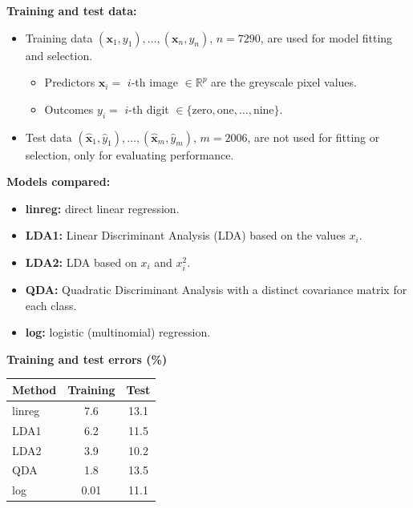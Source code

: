 \documentclass[
  letterpaper,
  DIV=11,
  numbers=noendperiod]{scrartcl}
\providecommand{\tightlist}{%
  \setlength{\itemsep}{0pt}\setlength{\parskip}{0pt}}\usepackage{longtable,booktabs,array}
\begin{document}
\begin{minipage}{0.55\textwidth}
\textbf{Training and test data:}  
\begin{itemize}
\tightlist
\item Training data $(\mathbf{x}_1, y_1), \ldots, (\mathbf{x}_n, y_n)$, $n = 7290$, are used for model fitting and selection.  
  \begin{itemize}
  \tightlist
  \item Predictors $\mathbf{x}_i =$ $i$-th image $\in \mathbb{R}^p$ are the greyscale pixel values.  
  \item Outcomes $y_i =$ $i$-th digit $\in \{\text{zero}, \text{one}, \ldots, \text{nine}\}$.
  \end{itemize}
\item Test data $(\hat{\mathbf{x}}_1, \hat{y}_1), \ldots, (\hat{\mathbf{x}}_m, \hat{y}_m)$, $m = 2006$, are not used for fitting or selection, only for evaluating performance.
\end{itemize}

\smallskip
\textbf{Models compared:}  
\begin{itemize}
\tightlist
\item \textbf{linreg:} direct linear regression.  
\item \textbf{LDA1:} Linear Discriminant Analysis (LDA) based on the values $x_i$.  
\item \textbf{LDA2:} LDA based on $x_i$ and $x_i^2$.  
\item \textbf{QDA:} Quadratic Discriminant Analysis with a distinct covariance matrix for each class.  
\item \textbf{log:} logistic (multinomial) regression.
\end{itemize}
\end{minipage}
\hfill
\begin{minipage}{0.4\textwidth}
\begin{center}
\textbf{Training and test errors (\%)}  
\begin{tabular}{lcc}
\hline
Method & Training & Test \\
\hline
linreg & 7.6 & 13.1 \\
LDA1 & 6.2 & 11.5 \\
LDA2 & 3.9 & 10.2 \\
QDA & 1.8 & 13.5 \\
log & 0.01 & 11.1 \\
\hline
\end{tabular}
\end{center}
\end{minipage}
\end{document}
